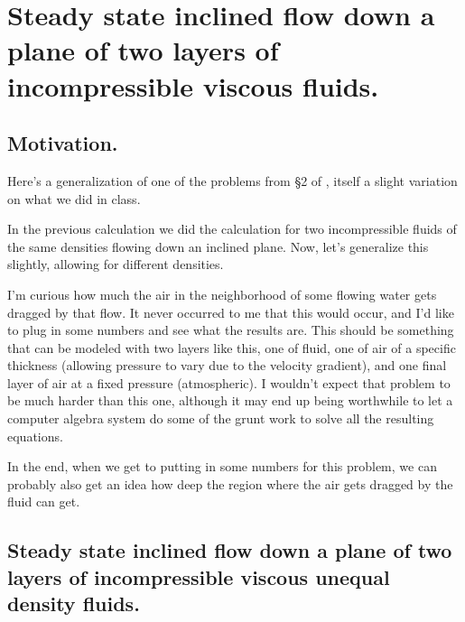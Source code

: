 
%


\chapter{Steady state inclined flow down a plane of two layers of incompressible viscous fluids.}
\label{chap:twoLayerInclinedFlowDifferentDensities}
{}
\date{Mar 1, 2012}

\beginArtWithToc

\section{Motivation.}

Here's a generalization of one of the problems from \S 2 of \cite{acheson1990elementary}, itself a slight variation on what we did in class.

In the previous calculation we did the calculation for two incompressible fluids of the same densities flowing down an inclined plane.  Now, let's generalize this slightly, allowing for different densities.

I'm curious how much the air in the neighborhood of some flowing water gets dragged by that flow.  It never occurred to me that this would occur, and I'd like to plug in some numbers and see what the results are.  This should be something that can be modeled with two layers like this, one of fluid, one of air of a specific thickness (allowing pressure to vary due to the velocity gradient), and one final layer of air at a fixed pressure (atmospheric).  I wouldn't expect that problem to be much harder than this one, although it may end up being worthwhile to let a computer algebra system do some of the grunt work to solve all the resulting equations.

In the end, when we get to putting in some numbers for this problem, we can probably also get an idea how deep the region where the air gets dragged by the fluid can get.

\section{Steady state inclined flow down a plane of two layers of incompressible viscous unequal density fluids.}

